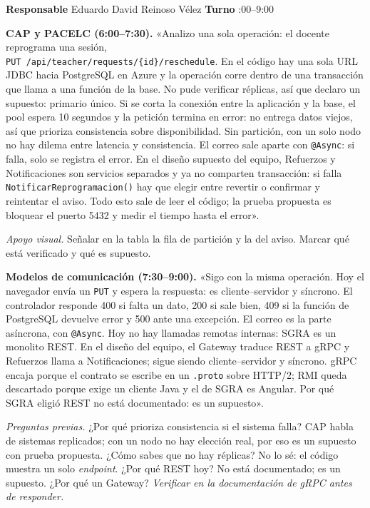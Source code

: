 \documentclass[10pt,a4paper]{article}
\begin{document}
\textbf{Responsable} \quad Eduardo David Reinoso Vélez \hfill \textbf{Turno} :00--9:00

\textbf{CAP y PACELC (6:00--7:30).}
«Analizo una sola operación: el docente reprograma una sesión,\\ \texttt{PUT /api/teacher/requests/\{id\}/reschedule}. En el código hay una sola URL JDBC hacia PostgreSQL en Azure y la operación corre dentro de una transacción que llama a una función de la base. No pude verificar réplicas, así que declaro un supuesto: primario único. Si se corta la conexión entre la aplicación y la base, el pool espera 10 segundos y la petición termina en error: no entrega datos viejos, así que prioriza consistencia sobre disponibilidad. Sin partición, con un solo nodo no hay dilema entre latencia y consistencia. El correo sale aparte con \texttt{@Async}: si falla, solo se registra el error. En el diseño supuesto del equipo, Refuerzos y Notificaciones son servicios separados y ya no comparten transacción: si falla \texttt{NotificarReprogramacion()} hay que elegir entre revertir o confirmar y reintentar el aviso. Todo esto sale de leer el código; la prueba propuesta es bloquear el puerto 5432 y medir el tiempo hasta el error».
\cite{back,ahmed2023}

\textit{Apoyo visual.} Señalar en la tabla la fila de partición y la del aviso. Marcar qué está verificado y qué es supuesto.

\textbf{Modelos de comunicación (7:30--9:00).}
«Sigo con la misma operación. Hoy el navegador envía un \texttt{PUT} y espera la respuesta: es cliente--servidor y síncrono. El controlador responde 400 si falta un dato, 200 si sale bien, 409 si la función de PostgreSQL devuelve error y 500 ante una excepción. El correo es la parte asíncrona, con \texttt{@Async}. Hoy no hay llamadas remotas internas: SGRA es un monolito REST. En el diseño del equipo, el Gateway traduce REST a gRPC y Refuerzos llama a Notificaciones; sigue siendo cliente--servidor y síncrono. gRPC encaja porque el contrato se escribe en un \texttt{.proto} sobre HTTP/2; RMI queda descartado porque exige un cliente Java y el de SGRA es Angular. Por qué SGRA eligió REST no está documentado: es un supuesto».\cite{back,kaminski2023,rozek2026,darbord2023}

\textit{Preguntas previas.} ¿Por qué prioriza consistencia si el sistema falla? CAP habla de sistemas replicados; con un nodo no hay elección real, por eso es un supuesto con prueba propuesta. ¿Cómo sabes que no hay réplicas? No lo sé: el código muestra un solo \emph{endpoint}. ¿Por qué REST hoy? No está documentado; es un supuesto. ¿Por qué un Gateway? \textit{Verificar en la documentación de gRPC antes de responder.}
\end{document}
